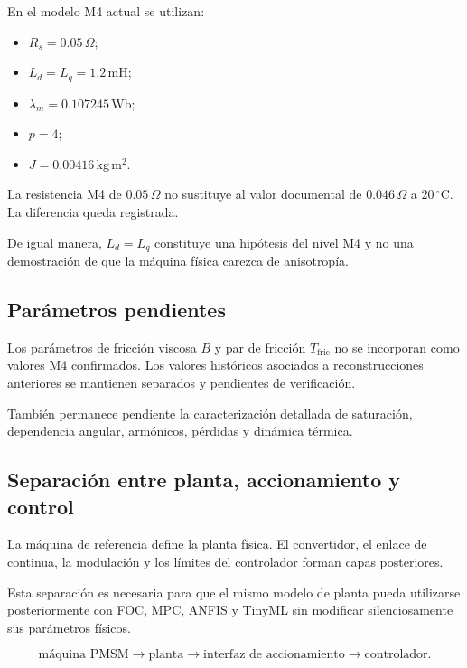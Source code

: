 En el modelo M4 actual se utilizan:

\begin{itemize}
    \item $R_s=0.05\,\Omega$;
    \item $L_d=L_q=1.2\,\mathrm{mH}$;
    \item $\lambda_m=0.107245\,\mathrm{Wb}$;
    \item $p=4$;
    \item $J=0.00416\,\mathrm{kg\,m^2}$.
\end{itemize}

La resistencia M4 de $0.05\,\Omega$ no sustituye al valor documental de $0.046\,\Omega$ a $20\,^{\circ}\mathrm{C}$. La diferencia queda registrada.

De igual manera, $L_d=L_q$ constituye una hipótesis del nivel M4 y no una demostración de que la máquina física carezca de anisotropía.

\subsection{Parámetros pendientes}

Los parámetros de fricción viscosa $B$ y par de fricción $T_{\mathrm{fric}}$ no se incorporan como valores M4 confirmados. Los valores históricos asociados a reconstrucciones anteriores se mantienen separados y pendientes de verificación.

También permanece pendiente la caracterización detallada de saturación, dependencia angular, armónicos, pérdidas y dinámica térmica.

\subsection{Separación entre planta, accionamiento y control}

La máquina de referencia define la planta física. El convertidor, el enlace de continua, la modulación y los límites del controlador forman capas posteriores.

Esta separación es necesaria para que el mismo modelo de planta pueda utilizarse posteriormente con FOC, MPC, ANFIS y TinyML sin modificar silenciosamente sus parámetros físicos.

\begin{equation}
\text{máquina PMSM}
\rightarrow
\text{planta}
\rightarrow
\text{interfaz de accionamiento}
\rightarrow
\text{controlador}.
\end{equation}

